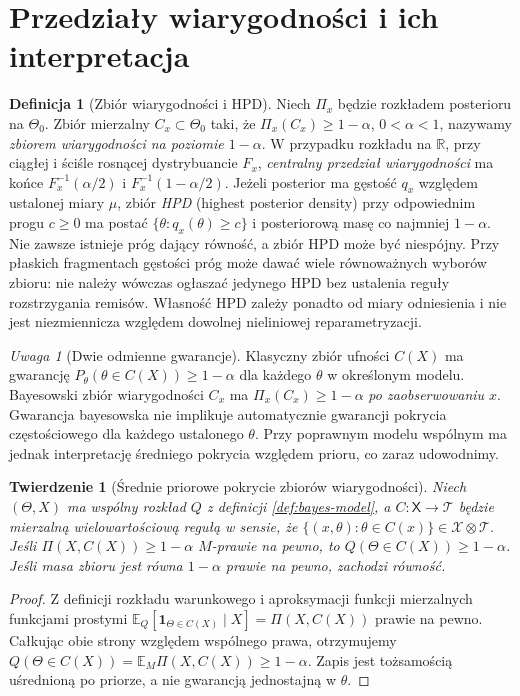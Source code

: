\documentclass[11pt,a4paper,oneside]{report}
\numberwithin{equation}{chapter}
\theoremstyle{plain}
\newtheorem{twierdzenie}{Twierdzenie}[chapter]
\theoremstyle{definition}
\newtheorem{definicja}{Definicja}[chapter]
\theoremstyle{remark}
\newtheorem{uwaga}{Uwaga}[chapter]
\newcommand{\R}{\mathbb R}
\newcommand{\E}{\mathbb E}
\newcommand{\ind}[1]{\mathbf 1_{#1}}
\begin{document}
\section{Przedziały wiarygodności i ich interpretacja}
\begin{definicja}[Zbiór wiarygodności i HPD]
Niech $\Pi_x$ będzie rozkładem posterioru na $\Theta_0$.
Zbiór mierzalny $C_x\subset\Theta_0$ taki, że
$\Pi_x(C_x)\ge1-\alpha$, $0<\alpha<1$, nazywamy
\emph{zbiorem wiarygodności na poziomie $1-\alpha$}.
W przypadku rozkładu na $\R$, przy ciągłej i ściśle rosnącej
dystrybuancie $F_x$, \emph{centralny przedział wiarygodności}
ma końce $F_x^{-1}(\alpha/2)$ i $F_x^{-1}(1-\alpha/2)$.
Jeżeli posterior ma gęstość $q_x$ względem ustalonej miary $\mu$,
zbiór \emph{HPD} (highest posterior density) przy odpowiednim
progu $c\ge0$ ma postać $\{\theta:q_x(\theta)\ge c\}$
i posteriorową masę co najmniej $1-\alpha$. Nie zawsze istnieje
próg dający równość, a zbiór HPD może być niespójny.
Przy płaskich fragmentach gęstości próg może dawać wiele równoważnych
wyborów zbioru: nie należy wówczas ogłaszać jedynego HPD bez
ustalenia reguły rozstrzygania remisów. Własność HPD zależy ponadto
od miary odniesienia i nie jest niezmiennicza względem dowolnej
nieliniowej reparametryzacji.
\end{definicja}

\begin{uwaga}[Dwie odmienne gwarancje]
Klasyczny zbiór ufności $C(X)$ ma gwarancję
$P_\theta(\theta\in C(X))\ge1-\alpha$ dla każdego $\theta$
w określonym modelu. Bayesowski zbiór wiarygodności $C_x$ ma
$\Pi_x(C_x)\ge1-\alpha$ \emph{po zaobserwowaniu $x$}.
Gwarancja bayesowska nie implikuje automatycznie gwarancji pokrycia
częstościowego dla każdego ustalonego $\theta$. Przy poprawnym
modelu wspólnym ma jednak interpretację średniego pokrycia
względem prioru, co zaraz udowodnimy.
\end{uwaga}

\begin{twierdzenie}[Średnie priorowe pokrycie zbiorów wiarygodności]
\label{thm:prior-coverage}
Niech $(\Theta,X)$ ma wspólny rozkład $Q$ z definicji
\ref{def:bayes-model}, a $C:\mathsf X\to\mathcal T$ będzie
mierzalną wielowartościową regułą w sensie, że
$\{(x,\theta):\theta\in C(x)\}\in\mathcal X\otimes\mathcal T$.
Jeśli $\Pi(X,C(X))\ge1-\alpha$ $M$-prawie na pewno,
to $Q(\Theta\in C(X))\ge1-\alpha$. Jeśli masa zbioru
jest równa $1-\alpha$ prawie na pewno, zachodzi równość.
\end{twierdzenie}
\begin{proof}
Z definicji rozkładu warunkowego i aproksymacji funkcji
mierzalnych funkcjami prostymi
$\E_Q[\ind{\Theta\in C(X)}\mid X]=\Pi(X,C(X))$
prawie na pewno. Całkując obie strony względem wspólnego prawa,
otrzymujemy $Q(\Theta\in C(X))=\E_M\Pi(X,C(X))\ge1-\alpha$.
Zapis jest tożsamością uśrednioną po priorze, a nie gwarancją
jednostajną w $\theta$.
\end{proof}
\end{document}
